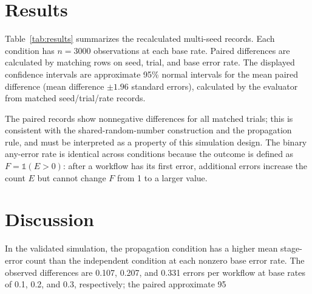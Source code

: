 \documentclass[conference]{IEEEtran}
\begin{document}
\section{Results}
Table~\ref{tab:results} summarizes the recalculated multi-seed records. Each condition has $n=3000$ observations at each base rate. Paired differences are calculated by matching rows on seed, trial, and base error rate. The displayed confidence intervals are approximate 95\% normal intervals for the mean paired difference (mean difference $\pm 1.96$ standard errors), calculated by the evaluator from matched seed/trial/rate records.

\begin{table}[t]
\centering
\caption{Recalculated stage-error counts and any-stage-error rates from the saved multi-seed CSV.}
\label{tab:results}
\small
{}
\end{table}

The paired records show nonnegative differences for all matched trials; this is consistent with the shared-random-number construction and the propagation rule, and must be interpreted as a property of this simulation design. The binary any-error rate is identical across conditions because the outcome is defined as $F=\mathbb{1}(E>0)$: after a workflow has its first error, additional errors increase the count $E$ but cannot change $F$ from 1 to a larger value.

\section{Discussion}
In the validated simulation, the propagation condition has a higher mean stage-error count than the independent condition at each nonzero base error rate. The observed differences are 0.107, 0.207, and 0.331 errors per workflow at base rates of 0.1, 0.2, and 0.3, respectively; the paired approximate 95%
\end{document}
